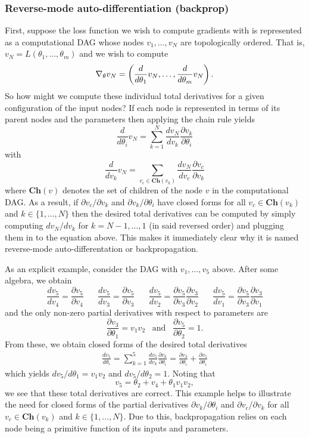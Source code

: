 \documentclass[11pt]{article}
\begin{document}
\subsubsection{Reverse-mode auto-differentiation (backprop)}
First, suppose the loss function we wish to compute gradients with is represented as a  computational DAG whose nodes $v_1,\dots,v_N$ are topologically ordered. That is, $v_N=L(\theta_1,\dots,\theta_m)$ and we wish to compute
$$
\nabla_{\theta}v_N
=
\left(\frac{d}{d\theta_1}v_N,\dots,\frac{d}{d\theta_m}v_N\right).
$$
So how might we compute these individual total derivatives for a given configuration of the input nodes? If each node is represented in terms of its parent nodes and the parameters then applying the chain rule yields
$$
\frac{d}{d\theta_i}v_N
=
\sum_{k=1}^N\frac{dv_N}{dv_k}\frac{\partial v_k}{\partial\theta_i}
$$
with
$$
\frac{d}{dv_k}v_N
=
\sum_{v_c\in\textbf{Ch}(v_k)}\frac{dv_N}{dv_c}\frac{\partial v_c}{\partial v_k}
$$
where $\textbf{Ch}(v)$ denotes the set of children of the node $v$ in the computational DAG. As a result, if $\partial v_c/\partial v_k$ and $\partial v_k/\partial\theta_i$ have closed forms for all $v_c\in\textbf{Ch}(v_k)$ and $k\in\{1,\dots,N\}$ then the desired total derivatives can be computed by simply computing $dv_N/dv_k$ for $k=N-1,\dots,1$ (in said reversed order) and plugging them in to the equation above. This makes it immediately clear why it is named reverse-mode auto-differentation or backpropagation.

As an explicit example, consider the DAG with $v_1,\dots,v_5$ above. After some algebra, we obtain
$$
\frac{dv_5}{dv_4}=\frac{\partial v_5}{\partial v_4} \hspace{20pt}
\frac{dv_5}{dv_3}=\frac{\partial v_5}{\partial v_3} \hspace{20pt}
\frac{dv_5}{dv_2}=\frac{\partial v_5}{\partial v_3}\frac{\partial v_3}{\partial v_2} \hspace{20pt}
\frac{dv_5}{dv_1}=\frac{\partial v_5}{\partial v_3}\frac{\partial v_3}{\partial v_1}
$$
and the only non-zero partial derivatives with respect to parameters are
$$
\frac{\partial v_3}{\partial\theta_1}=v_1v_2
\hspace{10pt}\text{and}\hspace{10pt}
\frac{\partial v_5}{\partial\theta_2}=1.
$$
From these, we obtain closed forms of the desired total derivatives
\begin{align*}
    \frac{dv_5}{d\theta_i}
    =
    \sum_{k=1}^5\frac{dv_5}{dv_k}\frac{\partial v_k}{\partial\theta_i}
    =
    \frac{\partial v_3}{\partial\theta_i}+\frac{\partial v_5}{\partial\theta_i}
\end{align*}
which yields $dv_5/d\theta_1=v_1v_2$ and $dv_5/d\theta_2=1$. Noting that
$$
v_5
=
\theta_2+v_4+\theta_1v_1v_2,
$$
we see that these total derivatives are correct. This example helps to illustrate the need for closed forms of the partial derivatives $\partial v_k/\partial\theta_i$ and $\partial v_c/\partial v_k$ for all $v_c\in\textbf{Ch}(v_k)$ and $k\in\{1,\dots,N\}$. Due to this, backpropagation relies on each node being a primitive function of its inputs and parameters.
\end{document}
